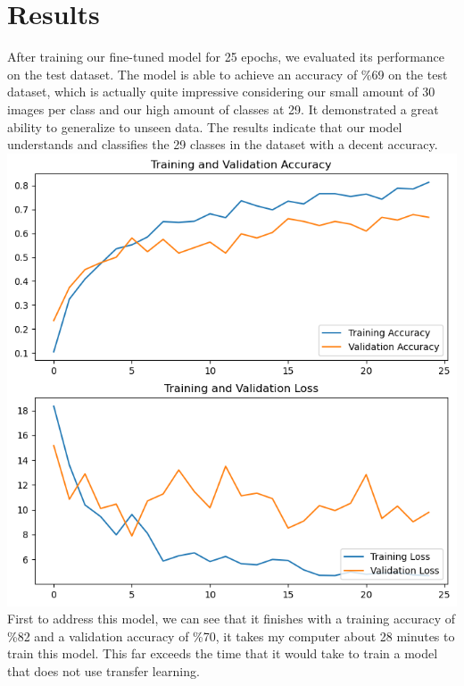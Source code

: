 \documentclass[12pt]{article}
\begin{document}
\section*{Results}
After training our fine-tuned model for 25 epochs, we evaluated its performance on the test dataset.
The model is able to achieve an accuracy of \%69 on the test dataset, which is actually quite impressive considering our small amount of 30
images per class and our high amount of classes at 29. It demonstrated a great ability to generalize to unseen data.
The results indicate that our model understands and classifies the 29 classes in the dataset with a decent accuracy.\\
\includegraphics*[scale=0.5]{images/loss+acc.png}\\
First to address this model, we can see that it finishes with a training accuracy of \%82 and a validation accuracy of \%70, it takes my computer about 28 minutes to train
this model. This far exceeds the time that it would take to train a model that does not use transfer learning. \\
\end{document}

